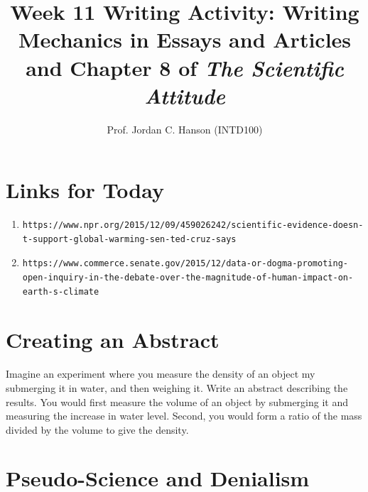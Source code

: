 \documentclass{article}
\begin{document}
\title{Week 11 Writing Activity: Writing Mechanics in Essays and Articles and Chapter 8 of \textit{The Scientific Attitude}}
\author{Prof. Jordan C. Hanson (INTD100)}

\maketitle

\section{Links for Today}
\small
\begin{enumerate}
\item
\begin{verbatim}
https://www.npr.org/2015/12/09/459026242/scientific-evidence-doesn-t-support-global-warming-sen-ted-cruz-says
\end{verbatim}
\item
\begin{verbatim}
https://www.commerce.senate.gov/2015/12/data-or-dogma-promoting-
open-inquiry-in-the-debate-over-the-magnitude-of-human-impact-on-earth-s-climate
\end{verbatim}
\end{enumerate}

\section{Creating an Abstract}
\normalsize
Imagine an experiment where you measure the density of an object my submerging it in water, and then weighing it.  Write an abstract describing the results.  You would first measure the volume of an object by submerging it and measuring the increase in water level.  Second, you would form a ratio of the mass divided by the volume to give the density.

\section{Pseudo-Science and Denialism}
\end{document}
